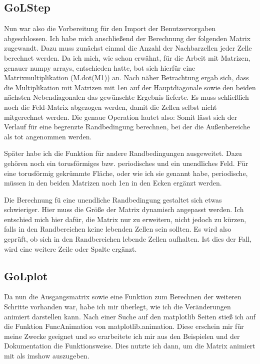 \documentclass{scrartcl}
\begin{document}
\subsection{GoLStep}
Nun war also die Vorbereitung für den Import der Benutzervorgaben abgeschlossen. Ich habe mich anschließend der Berechnung der folgenden Matrix zugewandt. Dazu muss zunächst einmal die Anzahl der Nachbarzellen jeder Zelle berechnet werden. Da ich mich, wie schon erwähnt, für die Arbeit mit Matrizen, genauer numpy arrays, entschieden hatte, bot sich hierfür eine Matrixmultiplikation (M.dot(M1)) an. Nach näher Betrachtung ergab sich, dass die Multiplikation mit Matrizen mit 1en auf der Hauptdiagonale sowie den beiden nächsten Nebendiagonalen das gewünschte Ergebnis lieferte. Es muss schließlich noch die Feld-Matrix abgezogen werden, damit die Zellen selbst nicht mitgerechnet werden. Die genaue Operation lautet also:
Somit lässt sich der Verlauf für eine begrenzte Randbedingung berechnen, bei der die Außenbereiche als tot angenommen werden. 

Später habe ich die Funktion für andere Randbedingungen ausgeweitet. Dazu gehören noch ein torusförmiges bzw. periodisches und ein unendliches Feld.
Für eine torusförmig gekrümmte Fläche, oder wie ich sie genannt habe, periodische, müssen in den beiden Matrizen noch 1en in den Ecken ergänzt werden.

Die Berechnung fü eine unendliche Randbedingung gestaltet sich etwas schwieriger. Hier muss die Größe der Matrix dynamisch angepasst werden. Ich entschied mich hier dafür, die Matrix nur zu erweitern, nicht jedoch zu kürzen, falls in den Randbereichen keine lebenden Zellen sein sollten. Es wird also geprüft, ob sich in den Randbereichen lebende Zellen aufhalten. Ist dies der Fall, wird eine weitere Zeile oder Spalte ergänzt.

\subsection{GoLplot}
Da nun die Ausgangsmatrix sowie eine Funktion zum Berechnen der weiteren Schritte vorhanden war, habe ich mir überlegt, wie ich die Veränderungen animiert darstellen kann. Nach einer Suche auf den matplotlib Seiten stieß ich auf die Funktion FuncAnimation von matplotlib.animation. Diese erschein mir für meine Zwecke geeignet und so erarbeitete ich mir aus den Beispielen und der Dokumentation die Funktionsweise. Dies nutzte ich dann, um die Matrix animiert mit als imshow auszugeben.
\end{document}

